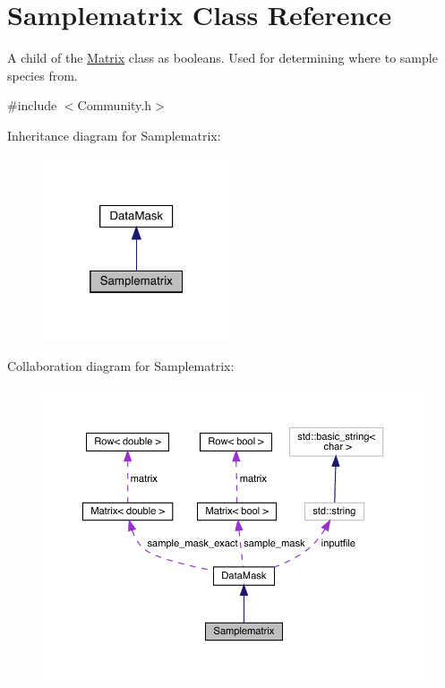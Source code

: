 \hypertarget{class_samplematrix}{}\section{Samplematrix Class Reference}
\label{class_samplematrix}


A child of the \hyperlink{class_matrix}{Matrix} class as booleans. Used for determining where to sample species from.  




{\ttfamily \#include $<$Community.\+h$>$}



Inheritance diagram for Samplematrix\+:\nopagebreak
\begin{figure}[H]
\begin{center}
\leavevmode
\includegraphics[width=157pt]{class_samplematrix__inherit__graph}
\end{center}
\end{figure}


Collaboration diagram for Samplematrix\+:\nopagebreak
\begin{figure}[H]
\begin{center}
\leavevmode
\includegraphics[width=350pt]{class_samplematrix__coll__graph}
\end{center}
\end{figure}
